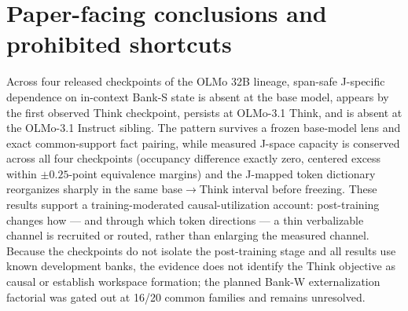 \documentclass[11pt]{article}
\begin{document}
\section{Paper-facing conclusions and prohibited shortcuts}\label{sec:claims}

\begin{claimbox}[title={Recommended development-tier conclusion paragraph}]
Across four released checkpoints of the OLMo 32B lineage, span-safe J-specific
dependence on in-context Bank-S state is absent at the base model, appears by
the first observed Think checkpoint, persists at OLMo-3.1 Think, and is absent
at the OLMo-3.1 Instruct sibling. The pattern survives a frozen base-model
lens and exact common-support fact pairing, while measured J-space capacity is
conserved across all four checkpoints (occupancy difference exactly zero,
centered excess within $\pm0.25$-point equivalence margins) and the J-mapped
token dictionary reorganizes sharply in the same base$\to$Think interval
before freezing. These results support a training-moderated
causal-utilization account: post-training changes how --- and through which
token directions --- a thin verbalizable channel is recruited or routed,
rather than enlarging the measured channel. Because the checkpoints do not
isolate the post-training stage and all results use known development banks,
the evidence does not identify the Think objective as causal or establish
workspace formation; the planned Bank-W externalization factorial was gated
out at 16/20 common families and remains unresolved.
\end{claimbox}
\end{document}
